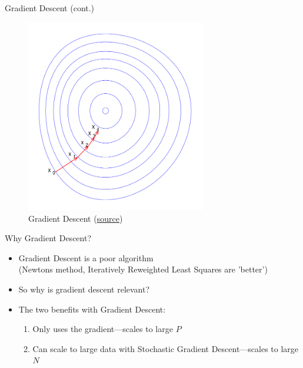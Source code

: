 \documentclass[10pt,handout]{beamer}
\begin{document}
\begin{frame}{Gradient Descent (cont.)}

\begin{figure}[h]
\caption{Gradient Descent (\href{https://en.wikipedia.org/wiki/Gradient_descent}{source})}
\centering
\includegraphics[width=0.7\textwidth]{figs/GD.png}
\end{figure}

\end{frame}




\begin{frame}{Why Gradient Descent?}


\begin{itemize}
\item Gradient Descent is a poor algorithm \\ (Newtons method, Iteratively Reweighted Least Squares are 'better')
\item So why is gradient descent relevant?\pause
\item The two benefits with Gradient Descent:
\begin{enumerate}
\item Only uses the gradient---scales to large $P$
\item Can scale to large data with Stochastic Gradient Descent---scales to large $N$
\end{enumerate}
\end{itemize}

\end{frame}
\end{document}
